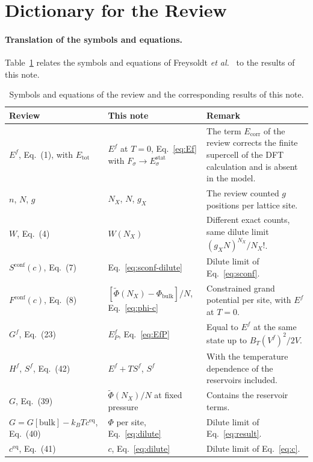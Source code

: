 \documentclass[11pt]{article}      %
\numberwithin{equation}{section}   %
\begin{document}
\section{Dictionary for the Review}

\paragraph{Translation of the symbols and equations.}
Table~\ref{tab:dictionary} relates the symbols and equations of Freysoldt
\textit{et al.}~\cite{freysoldt} to the results of this note.

\begin{table}[H]
\centering
\caption{Symbols and equations of the review and the corresponding results
of this note.}
\label{tab:dictionary}
\renewcommand{\arraystretch}{1.35}
\begin{tabular}{|>{\raggedright\arraybackslash}p{}
                |>{\raggedright\arraybackslash}p{}
                |>{\raggedright\arraybackslash}p{}|}
\hline
Review & This note & Remark \\ \hline
$E^f$, Eq.~(1), with $E_{\text{tot}}$ & $E^f$ at $T=0$,
Eq.~\eqref{eq:Ef} with $F_\sigma\to E^{\text{stat}}_\sigma$ & The term
$E_{\text{corr}}$ of the review corrects the finite supercell of the DFT
calculation and is absent in the model. \\ \hline
$n$, $N$, $g$ & $N_X$, $N$, $g_X$ & The review counted $g$ positions per
lattice site. \\ \hline
$W$, Eq.~(4) & $W(N_X)$ & Different exact counts, same dilute limit
$(g_XN)^{N_X}/N_X!$. \\ \hline
$S^{\text{conf}}(c)$, Eq.~(7) & Eq.~\eqref{eq:sconf-dilute} & Dilute limit
of Eq.~\eqref{eq:sconf}. \\ \hline
$F^{\text{conf}}(c)$, Eq.~(8) &
$[\widetilde{\Phi}(N_X)-\Phi_{\text{bulk}}]/N$, Eq.~\eqref{eq:phi-c} &
Constrained grand potential per site, with $E^f$ at $T=0$. \\ \hline
$G^f$, Eq.~(23) & $E^f_P$, Eq.~\eqref{eq:EfP} & Equal to $E^f$ at the same
state up to $B_T(V^f)^2/2V$. \\ \hline
$H^f$, $S^f$, Eq.~(42) & $E^f+TS^f$, $S^f$ & With the temperature
dependence of the reservoirs included. \\ \hline
$G$, Eq.~(39) & $\widetilde{\Phi}(N_X)/N$ at fixed pressure & Contains the
reservoir terms. \\ \hline
$G=G[\text{bulk}]-k_BTc^{\text{eq}}$, Eq.~(40) & $\Phi$ per site,
Eq.~\eqref{eq:dilute} & Dilute limit of Eq.~\eqref{eq:result}. \\ \hline
$c^{\text{eq}}$, Eq.~(41) & $c$, Eq.~\eqref{eq:dilute} & Dilute limit of
Eq.~\eqref{eq:c}. \\ \hline
\end{tabular}
\end{table}
\end{document}
